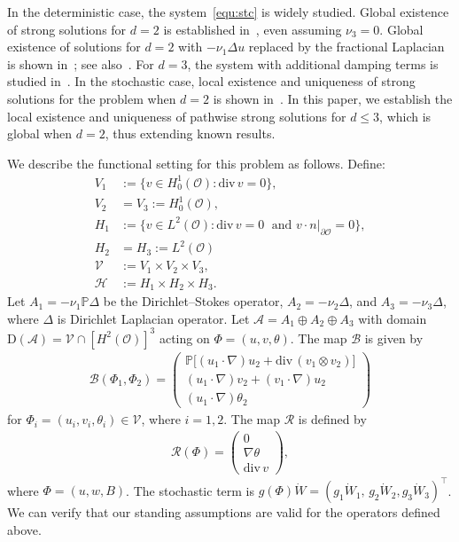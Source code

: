 \documentclass[11pt, reqno]{amsart}
\theoremstyle{definition}
\numberwithin{equation}{section}
\newcommand{\bb}{\mathbb}
\newcommand{\divg}{\mathrm{div}\,}
\begin{document}
In the deterministic case, the system~\eqref{equ:stc} is widely studied. Global existence of strong solutions for $d=2$ is established in~\cite{LiTi16}, even assuming $\nu_3=0$. Global existence of solutions for $d=2$ with $-\nu_1\Delta u$ replaced by the fractional Laplacian is shown in~\cite{Ye17}; see also~\cite{DonWanWu19, DonWuYe19}. For $d=3$, the system with additional damping terms is studied in~\cite{YuaChe21}. In the stochastic case, local existence and uniqueness of strong solutions for the problem when $d=2$ is shown in~\cite{YinYan23}. In this paper, we establish the local existence and uniqueness of pathwise strong solutions for $d\leq 3$, which is global when $d=2$, thus extending known results.

We describe the functional setting for this problem as follows. Define:
\begin{align*}
    V_1 &:= \{v\in H^1_0(\mathscr{O}): \divg v=0\},
    \\
    V_2 &= V_3 := H^1_0(\mathscr{O}),
    \\
    H_1 &:= \{v\in L^2(\mathscr{O}): \divg v=0 \;\text{ and } \left. v\cdot n \right|_{\partial \mathscr{O}}= 0\},
    \\
    H_2 &= H_3 := L^2(\mathscr{O})
    \\
    \mathcal{V} &:= V_1 \times V_2 \times V_3,
    \\
    \mathcal{H} &:= H_1 \times H_2 \times H_3.
\end{align*}
Let $A_1= -\nu_1 \bb{P}\Delta$ be the Dirichlet--Stokes operator, $A_2=-\nu_2\Delta$, and $A_3=-\nu_3 \Delta$, where $\Delta$ is Dirichlet Laplacian operator. Let $\mathcal{A}= A_1 \oplus A_2 \oplus A_3$ with domain $\mathrm{D}(\mathcal{A})= \mathcal{V} \cap \left[H^2(\mathscr{O})\right]^3$ acting on $\Phi=(u,v,\theta)$. The map $\mathcal{B}$ is given by
\begin{align*}
    \mathcal{B}(\Phi_1,\Phi_2)= 
    \begin{pmatrix} \bb{P}\big[(u_1\cdot\nabla)u_2+ \divg(v_1\otimes v_2) \big] \\[0.5ex] (u_1\cdot\nabla) v_2 + (v_1\cdot\nabla) u_2
    \\[0.5ex]
    (u_1\cdot\nabla)\theta_2 \end{pmatrix}
\end{align*}
for $\Phi_i=(u_i,v_i,\theta_i)\in \mathcal{V}$, where $i=1,2$. The map $\mathcal{R}$ is defined by
\begin{align*}
    \mathcal{R}(\Phi)= 
    \begin{pmatrix} 0 \\[0.5ex] \nabla\theta \\[0.5ex] \divg v \end{pmatrix},
\end{align*}
where $\Phi=(u,w,B)$. The stochastic term is $g(\Phi)\dot{W}= (g_1\dot{W}_1,\, g_2\dot{W}_2, g_3\dot{W}_3)^\top$. We can verify that our standing assumptions are valid for the operators defined above.
\end{document}

